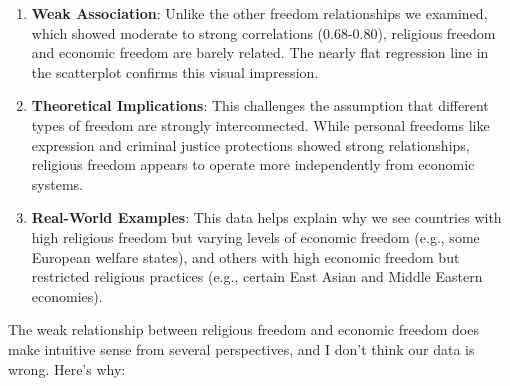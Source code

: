 \documentclass[
]{article}
\begin{document}
\begin{enumerate}
\def\labelenumi{\arabic{enumi}.}
\item
  \textbf{Weak Association}: Unlike the other freedom relationships we
  examined, which showed moderate to strong correlations (0.68-0.80),
  religious freedom and economic freedom are barely related. The nearly
  flat regression line in the scatterplot confirms this visual
  impression.
\item
  \textbf{Theoretical Implications}: This challenges the assumption that
  different types of freedom are strongly interconnected. While personal
  freedoms like expression and criminal justice protections showed
  strong relationships, religious freedom appears to operate more
  independently from economic systems.
\item
  \textbf{Real-World Examples}: This data helps explain why we see
  countries with high religious freedom but varying levels of economic
  freedom (e.g., some European welfare states), and others with high
  economic freedom but restricted religious practices (e.g., certain
  East Asian and Middle Eastern economies).
\end{enumerate}

The weak relationship between religious freedom and economic freedom
does make intuitive sense from several perspectives, and I don't think
our data is wrong. Here's why:
\end{document}
